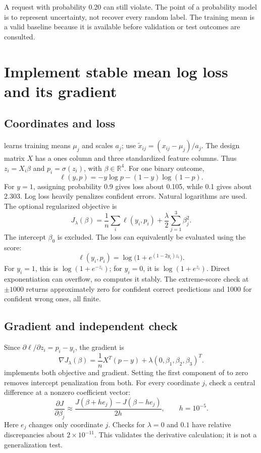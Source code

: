 A request with probability 0.20 can still violate. The point of a probability model is to represent uncertainty, not recover every random label. The training mean is a valid baseline because it is available before validation or test outcomes are consulted.

\section{Implement stable mean log loss and its gradient}
\subsection*{Coordinates and loss}
 learns training means $\mu_j$ and scales $a_j$; use $\tilde x_{ij}=(x_{ij}-\mu_j)/a_j$. The design matrix $X$ has a ones column and three standardized feature columns. Thus $z_i=X_i\beta$ and $p_i=\sigma(z_i)$, with $\beta\in\mathbb R^4$.
For one binary outcome,
\[\ell(y,p)=-y\log p-(1-y)\log(1-p).\]
For $y=1$, assigning probability 0.9 gives loss about 0.105, while 0.1 gives about 2.303. Log loss heavily penalizes confident errors. Natural logarithms are used.
The optional regularized objective is
\[J_\lambda(\beta)=\frac1n\sum_i\ell(y_i,p_i)+\frac\lambda2\sum_{j=1}^3\beta_j^2.\]
The intercept $\beta_0$ is excluded. The loss can equivalently be evaluated using the score:
\[\ell(y_i,p_i)=\log\bigl(1+e^{(1-2y_i)z_i}\bigr).\]
For $y_i=1$, this is $\log(1+e^{-z_i})$; for $y_i=0$, it is $\log(1+e^{z_i})$. Direct exponentiation can overflow, so  computes it stably. The extreme-score check at $\pm1000$ returns approximately zero for confident correct predictions and 1000 for confident wrong ones, all finite.

\subsection*{Gradient and independent check}
Since $\partial\ell/\partial z_i=p_i-y_i$, the gradient is
\[\nabla J_\lambda(\beta)=\frac1nX^T(p-y)+\lambda(0,\beta_1,\beta_2,\beta_3)^T.\]
 implements both objective and gradient. Setting the first component of  to zero removes intercept penalization from both.
For every coordinate $j$, check a central difference at a nonzero coefficient vector:
\[\frac{\partial J}{\partial\beta_j}\approx
\frac{J(\beta+h e_j)-J(\beta-h e_j)}{2h},\qquad h=10^{-5}.\]
Here $e_j$ changes only coordinate $j$. Checks for $\lambda=0$ and $0.1$ have relative discrepancies about $2\times10^{-11}$. This validates the derivative calculation; it is not a generalization test.

